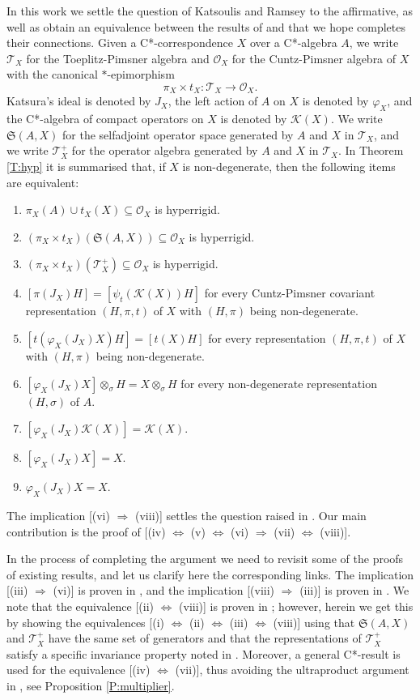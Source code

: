 \documentclass[11pt, draft]{amsart}
\numberwithin{equation}{section}
\theoremstyle{plain}
\theoremstyle{definition}
\theoremstyle{remark}
\newcommand{\K}{{\mathcal{K}}}
\renewcommand{\O}{{\mathcal{O}}}
\newcommand{\T}{{\mathcal{T}}}
\def\si{\sigma}
\newcommand\vphi{\varphi}
\newcommand{\fS}{{\mathfrak{S}}}
\begin{document}
In this work we settle the question of Katsoulis and Ramsey \cite{KR20} to the affirmative, as well as obtain an equivalence between the results of \cite{Kim21} and \cite{KR20, KR21} that we hope completes their connections.
Given a C*-correspondence $X$ over a C*-algebra $A$, we write $\T_X$ for the Toeplitz-Pimsner algebra and $\O_X$ for the Cuntz-Pimsner algebra of $X$ with the canonical $*$-epimorphism
\[
\pi_X \times t_X \colon \T_X \to \O_X.
\]
Katsura's ideal is denoted by $J_X$, the left action of $A$ on $X$ is denoted by $\vphi_X$, and the C*-algebra of compact operators on $X$ is denoted by $\K(X)$.
We write $\fS(A,X)$ for the selfadjoint operator space generated by $A$ and $X$ in $\T_X$, and we write $\T_X^+$ for the operator algebra generated by $A$ and $X$ in $\T_X$.
In Theorem \ref{T:hyp} it is summarised that, if $X$ is non-degenerate, then the following items are equivalent:
\begin{enumerate}
\item $\pi_X(A) \cup t_X(X)\subseteq \O_X$ is hyperrigid.
\item $(\pi_X \times t_X)(\fS(A,X)) \subseteq \O_X$ is hyperrigid.
\item $(\pi_X \times t_X)(\T_X^+) \subseteq \O_X$ is hyperrigid.
\item $[\pi(J_X)H] = [\psi_t(\K(X))H]$ for every Cuntz-Pimsner covariant representation $(H,\pi,t)$ of $X$ with $(H,\pi)$ being non-degenerate.
\item $[t(\vphi_X(J_X)X)H] = [t(X)H]$ for every representation $(H,\pi,t)$ of $X$ with $(H,\pi)$ being non-degenerate.
\item $[\vphi_X(J_X)X] \otimes_\si H = X \otimes_\si H$ for every non-degenerate representation $(H,\si)$ of $A$.
\item $[\vphi_X(J_X) \K(X)]  =\K(X)$.
\item $[\vphi_X(J_X) X] = X$.
\item $\vphi_X(J_X) X = X$.
\end{enumerate}
The implication [(vi) $\Rightarrow$ (viii)] settles the question raised in \cite{KR20}.
Our main contribution is the proof of [(iv) $\Leftrightarrow$ (v) $\Leftrightarrow$ (vi) $\Rightarrow$ (vii) $\Leftrightarrow$ (viii)].

In the process of completing the argument we need to revisit some of the proofs of existing results, and let us clarify here the corresponding links.
The implication [(iii) $\Rightarrow$ (vi)] is proven in \cite[Theorem 2.7]{KR20}, and the implication [(viii) $\Rightarrow$ (iii)] is proven in \cite[Theorem 3.1]{KR21}.
We note that the equivalence [(ii) $\Leftrightarrow$ (viii)] is proven in \cite[Theorem 3.5]{Kim21}; however, herein we get this by showing the equivalences [(i) $\Leftrightarrow$ (ii) $\Leftrightarrow$ (iii) $\Leftrightarrow$ (viii)] using that $\fS(A,X)$ and $\T_X^+$ have the same set of generators and that the representations of $\T_X^+$ satisfy a specific invariance property noted in \cite{KK12}.
Moreover, a general C*-result is used for the equivalence [(iv) $\Leftrightarrow$ (vii)], thus avoiding the ultraproduct argument in \cite[proof of Theorem 3.5]{Kim21}, see Proposition \ref{P:multiplier}.
\end{document}
